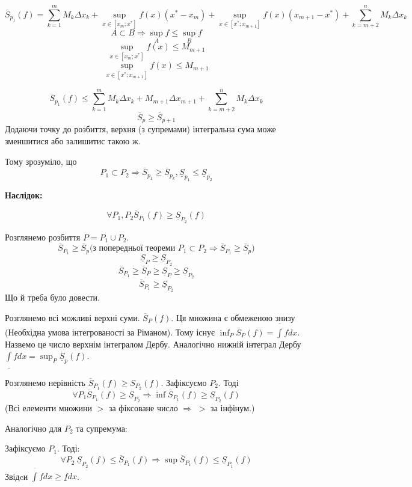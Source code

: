 \documentclass[12pt]{report}
\begin{document}
	$$\overline S_{p_1}(f) = \sum_{k = 1}^m M_{k} \Delta x_k + \sup_{x \in [x_{m}; x^{*}]} f(x) (x^* - x_m) + \sup_{x \in [x^{*}; x_{m+1}]} f(x) (x_{m+1} - x^*) + \sum_{k = m+2}^n M_k \Delta x_k$$
	$$A \subset B \Longrightarrow \sup_{A} f \leq \sup_{B} f$$
	$$\sup_{x \in [x_{m}; x^{*}]} f(x) \leq M_{m+1}$$
	$$\sup_{x \in [x^{*}; x_{m+1}]} f(x) \leq M_{m+1}$$
	
	$$\overline S_{p_1}(f) \leq \sum_{k = 1}^m M_{k} \Delta x_k + M_{m+1}\Delta x_{m+1} + \sum_{k = m+2}^n M_k \Delta x_k$$
	$$\overline S_p \geq \overline S_{p+1}$$
	Додаючи точку до розбиття, верхня (з супремами) інтегральна сума може зменшитися або залишитис такою ж.
	
	Тому зрозуміло, що 
	$$P_1 \subset P_2 \Longrightarrow \overline S_{p_1} \geq \overline S_{p_k}, \underline S_{p_1} \leq \underline S_{p_2}$$
	
	\textbf{Наслідок:}
	
	$$\forall P_1, P_2 \overline S_{P_1}(f) \geq \underline S_{P_2}(f)$$ 
	
	Розглянемо розбиття $P = P_1 \cup P_2$.
	$$\overline S_{P_1} \geq \overline S_{p} \textrm{(з попередньої теореми $P_1 \subset P_2 \Longrightarrow \overline S_{P_1} \geq \overline S_{p}$)}$$
	$$\underline S_{P} \geq \underline S_{P_2}$$
	$$\overline S_{P_1} \geq \overline S_{P} \geq \underline S_{P} \geq \underline S_{P_2}$$
	$$\overline S_{P_1} \geq \underline S_{P_2}$$
	Що й треба було довести.
	
	\vspace{3mm}
	
	Розглянемо всі можливі верхні суми. $\overline S_{P} (f)$. Ця множина є обмеженою знизу (Необхідна умова інтегрованості за Ріманом). 
	Тому існує $\inf_{P} \overline S_{P} (f) = \overline \int f dx$. Назвемо це число верхнім інтегралом Дербу. Аналогічно 
	нижній інтеграл Дербу $\underline \int f dx = \sup_{P} \underline S_{p} (f)$.
	
	\vspace{3mm}
	
	Розглянемо нерівність $\overline S_{P_1} (f) \geq S_{P_2} (f)$. 
	Зафіксуємо $P_2$. Тоді 
	$$\forall P_1 \overline S_{P_1} (f) \geq \underline S_{P_2} \Longrightarrow \inf \overline S_{P_1} (f) \geq \underline S_{P_2} (f)$$
	(Всі елементи множини $>$ за фіксоване число $\Longrightarrow$ $>$ за інфінум.)
	
	Аналогічно для $P_2$ та супремума:
	
	Зафіксуємо $P_1$. Тоді:
	$$\forall P_2 \ \underline S_{P_2} (f) \leq \overline S_{P_1} (f) \Longrightarrow \sup \overline S_{P_1} (f) \leq \underline S_{P_1} (f)$$
	Звідcи $\overline \int fdx \geq \underline f dx$.
	
\end{document}
